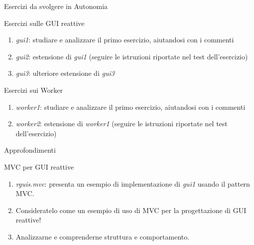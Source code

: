 \documentclass[presentation]{beamer}
\begin{document}
\begin{frame}{Esercizi da svolgere in Autonomia}
\begin{block}{Esercizi sulle GUI reattive}
\begin{enumerate}
\item \emph{gui1}: studiare e analizzare il primo esercizio, aiutandosi con i commenti
\item \emph{gui2}: estensione di \emph{gui1} (seguire le istruzioni riportate nel test dell'esercizio)
\item \emph{gui3}: ulteriore estensione di \emph{gui3}
\end{enumerate}
\end{block}

\begin{block}{Esercizi sui Worker}
\begin{enumerate}
\item  \emph{worker1}: studiare e analizzare il primo esercizio, aiutandosi con i commenti
\item \emph{worker2}: estensione di \emph{worker1} (seguire le istruzioni riportate nel test dell'esercizio)
\end{enumerate}
\end{block}
\end{frame}

\begin{frame}{Approfondimenti}
\begin{block}{MVC per GUI reattive}
\begin{enumerate}
\item \emph{rguis.mvc}: presenta un esempio di implementazione di \emph{gui1} usando il pattern MVC. 
\item Consideratelo come un esempio di uso di MVC per la progettazione di GUI reattive!
\item Analizzarne e comprenderne struttura e comportamento.
\end{enumerate}
\end{block}

\end{frame}
\end{document}
